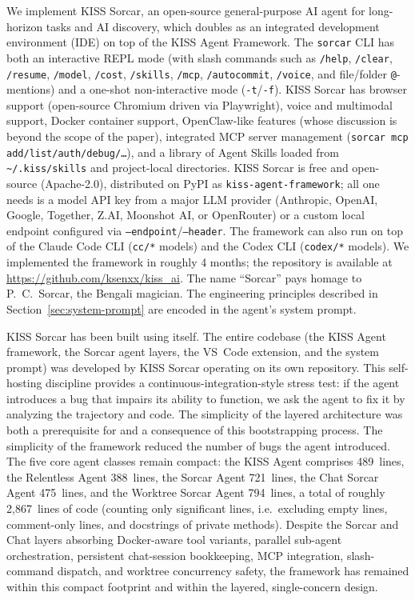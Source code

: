 \documentclass{article}
\begin{document}
We implement KISS Sorcar, an open-source general-purpose AI agent for long-horizon tasks and AI discovery, which doubles as an integrated development environment (IDE) on top of the KISS Agent Framework.  The \texttt{sorcar} CLI has both an interactive REPL mode (with slash commands such as \texttt{/help}, \texttt{/clear}, \texttt{/resume}, \texttt{/model}, \texttt{/cost}, \texttt{/skills}, \texttt{/mcp}, \texttt{/autocommit}, \texttt{/voice}, and file/folder \texttt{@}-mentions) and a one-shot non-interactive mode (\texttt{-t}/\texttt{-f}).  KISS Sorcar has browser support (open-source Chromium driven via Playwright), voice and multimodal support, Docker container support, OpenClaw-like features (whose discussion is beyond the scope of the paper), integrated MCP server management (\texttt{sorcar mcp add/list/auth/debug/\ldots}), and a library of Agent Skills loaded from \texttt{\textasciitilde{}/.kiss/skills} and project-local directories.  KISS Sorcar is free and open-source (Apache-2.0), distributed on PyPI as \texttt{kiss-agent-framework}; all one needs is a model API key from a major LLM provider (Anthropic, OpenAI, Google, Together, Z.AI, Moonshot AI, or OpenRouter) or a custom local endpoint configured via \texttt{--endpoint}/\texttt{--header}.  The framework can also run on top of the Claude Code CLI (\texttt{cc/*} models) and the Codex CLI (\texttt{codex/*} models).  We implemented the framework in roughly 4 months; the repository is available at \url{https://github.com/ksenxx/kiss_ai}.  The name ``Sorcar'' pays homage to P.~C.~Sorcar, the Bengali magician.  The engineering principles described in Section~\ref{sec:system-prompt} are encoded in the agent's system prompt.

KISS Sorcar has been built using itself.  The entire codebase (the KISS Agent framework, the Sorcar agent layers, the VS~Code extension, and the system prompt) was developed by KISS Sorcar operating on its own repository.  This self-hosting discipline provides a continuous-integration-style stress test: if the agent introduces a bug that impairs its ability to function, we ask the agent to fix it by analyzing the trajectory and code.  The simplicity of the layered architecture was both a prerequisite for and a consequence of this bootstrapping process. The simplicity of the framework reduced the number of bugs the agent introduced.  The five core agent classes remain compact: the KISS Agent comprises 489~lines, the Relentless Agent 388~lines, the Sorcar Agent 721~lines, the Chat Sorcar Agent 475~lines, and the Worktree Sorcar Agent 794~lines, a total of roughly 2,867~lines of code (counting only significant lines, i.e.\ excluding empty lines, comment-only lines, and docstrings of private methods).  Despite the Sorcar and Chat layers absorbing Docker-aware tool variants, parallel sub-agent orchestration, persistent chat-session bookkeeping, MCP integration, slash-command dispatch, and worktree concurrency safety, the framework has remained within this compact footprint and within the layered, single-concern design.
\end{document}
